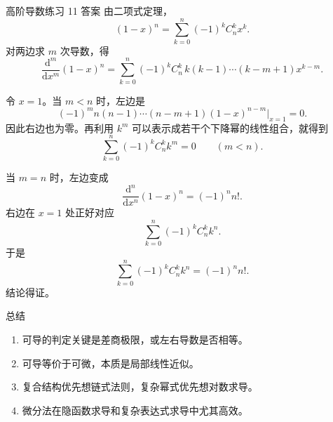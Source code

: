 ﻿\documentclass[aspectratio=169,11pt]{ctexbeamer}
\begin{document}
\begin{frame}[allowframebreaks]{高阶导数练习 11 答案}
\small
由二项式定理，
\[
(1-x)^n=\sum_{k=0}^n(-1)^kC_n^kx^k.
\]
对两边求 $m$ 次导数，得
\[
\frac{\mathrm d^m}{\mathrm dx^m}(1-x)^n
=\sum_{k=0}^n(-1)^kC_n^k\,k(k-1)\cdots(k-m+1)x^{k-m}.
\]

令 $x=1$。当 $m<n$ 时，左边是
\[
(-1)^m n(n-1)\cdots(n-m+1)(1-x)^{n-m}\Big|_{x=1}=0.
\]
因此右边也为零。再利用 $k^m$ 可以表示成若干个下降幂的线性组合，就得到
\[
\sum_{k=0}^n(-1)^kC_n^kk^m=0\qquad (m<n).
\]

当 $m=n$ 时，左边变成
\[
\frac{\mathrm d^n}{\mathrm dx^n}(1-x)^n=(-1)^nn!.
\]
右边在 $x=1$ 处正好对应
\[
\sum_{k=0}^n(-1)^kC_n^kk^n.
\]
于是
\[
\sum_{k=0}^n(-1)^kC_n^kk^n=(-1)^nn!.
\]
结论得证。
\end{frame}
\begin{frame}{总结}
\begin{enumerate}
  \item 可导的判定关键是差商极限，或左右导数是否相等。
  \item 可导等价于可微，本质是局部线性近似。
  \item 复合结构优先想链式法则，复杂幂式优先想对数求导。
  \item 微分法在隐函数求导和复杂表达式求导中尤其高效。
\end{enumerate}
\end{frame}
\end{document}
